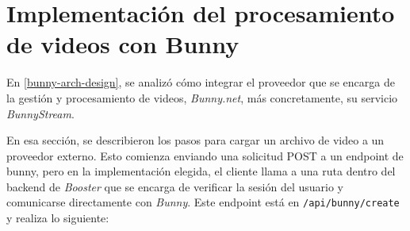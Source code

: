 \section{Implementación del procesamiento de videos con Bunny}
\label{bunny-endpoints}

En \ref{bunny-arch-design}, se analizó cómo integrar el proveedor que se encarga de la gestión y procesamiento de videos, \textit{Bunny.net}, más concretamente, su servicio \textit{BunnyStream}. 

En esa sección, se describieron los pasos para cargar un archivo de video a un proveedor externo. Esto comienza enviando una solicitud POST a un endpoint de bunny, pero en la implementación elegida, el cliente llama a una ruta dentro del backend de \textit{Booster} que se encarga de verificar la sesión del usuario y comunicarse directamente con \textit{Bunny}. Este endpoint está en \texttt{/api/bunny/create} y realiza lo siguiente: 


